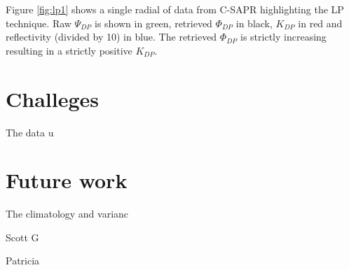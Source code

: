 \documentclass[twocol]{ametsoc}
\begin{document}
Figure \ref{fig:lp1} shows a single radial of data from C-SAPR highlighting the LP technique. Raw $\Psi_{DP}$ is shown in green, retrieved $\Phi_{DP}$ in black, $K_{DP}$ in red and reflectivity (divided by 10) in blue. The retrieved  $\Phi_{DP}$ is strictly increasing resulting in a strictly positive $K_{DP}$.


\section{Challeges}
The data u

\section{Future work}
The climatology and varianc


\acknowledgments{}

Scott G

Patricia

%
%
%
\end{document}

